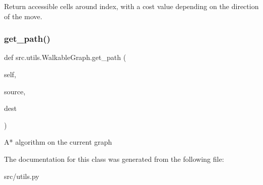 \begin{DoxyVerb}Return accessible cells around index, with a cost value depending
on the direction of the move.
\end{DoxyVerb}
 \hypertarget{classsrc_1_1utils_1_1_walkable_graph_afd2df4fd215571707ca30ce6776fe1ce}{}\label{classsrc_1_1utils_1_1_walkable_graph_afd2df4fd215571707ca30ce6776fe1ce} 
\subsubsection{\texorpdfstring{get\+\_\+path()}{get\_path()}}
{\footnotesize\ttfamily def src.\+utils.\+Walkable\+Graph.\+get\+\_\+path (\begin{DoxyParamCaption}\item[{}]{self,  }\item[{}]{source,  }\item[{}]{dest }\end{DoxyParamCaption})}

\begin{DoxyVerb}A* algorithm on the current graph \end{DoxyVerb}
 

The documentation for this class was generated from the following file\+:\begin{DoxyCompactItemize}
\item 
src/utils.\+py\end{DoxyCompactItemize}
